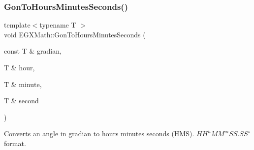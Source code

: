 \subsubsection{\texorpdfstring{Gon\+To\+Hours\+Minutes\+Seconds()}{GonToHoursMinutesSeconds()}}
{\footnotesize\ttfamily template$<$typename T $>$ \\
void E\+G\+X\+Math\+::\+Gon\+To\+Hours\+Minutes\+Seconds (\begin{DoxyParamCaption}\item[{const T \&}]{gradian,  }\item[{T \&}]{hour,  }\item[{T \&}]{minute,  }\item[{T \&}]{second }\end{DoxyParamCaption})}



Converts an angle in gradian to hours minutes seconds (H\+MS). ${HH}^h{MM}^m{SS.SS}^s$ format. 


